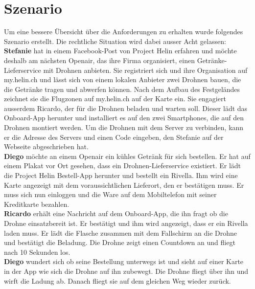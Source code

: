 \section{Szenario}

Um eine bessere Übersicht über die Anforderungen zu erhalten wurde folgendes Szenario erstellt. Die rechtliche Situation wird dabei ausser Acht gelassen:\\

\textbf{Stefanie} hat in einem Facebook-Post von Project Helin erfahren und möchte deshalb am nächsten Openair, das ihre Firma organisiert, einen Getränke-Lieferservice mit Drohnen anbieten. Sie registriert sich und ihre Organisation auf my.helin.ch und lässt sich von einem lokalen Anbieter zwei Drohnen bauen, die die Getränke tragen und abwerfen können. Nach dem Aufbau des Festgeländes zeichnet sie die Flugzonen auf my.helin.ch auf der Karte ein. Sie engagiert ausserdem Ricardo, der für die Drohnen beladen und warten soll. Dieser lädt das Onboard-App herunter und installiert es auf den zwei Smartphones, die auf den Drohnen montiert werden. Um die Drohnen mit dem Server zu verbinden, kann er die Adresse des Servers und einen Code eingeben, den Stefanie auf der Webseite abgeschrieben hat.\\

\textbf{Diego} möchte an einem Openair ein kühles Getränk für sich bestellen. Er hat auf einem Plakat vor Ort gesehen, dass ein Drohnen-Lieferservice existiert. Er lädt die Project Helin Bestell-App herunter und bestellt ein Rivella. Ihm wird eine Karte angezeigt mit dem voraussichtlichen Lieferort, den er bestätigen muss. Er muss sich nun einloggen und die Ware auf dem Mobiltelefon mit seiner Kreditkarte bezahlen.\\

\textbf{Ricardo} erhält eine Nachricht auf dem Onboard-App, die ihn fragt ob die Drohne einsatzbereit ist. Er bestätigt und ihm wird angezeigt, dass er ein Rivella laden muss. Er lädt die Flasche zusammen mit dem Fallschirm an die Drohne und bestätigt die Beladung. Die Drohne zeigt einen Countdown an und fliegt nach 10 Sekunden los. \\

\textbf{Diego} wundert sich ob seine Bestellung unterwegs ist und sieht auf einer Karte in der App wie sich die Drohne auf ihn zubewegt. Die Drohne fliegt über ihn und wirft die Ladung ab. Danach fliegt sie auf dem gleichen Weg wieder zurück.\\

